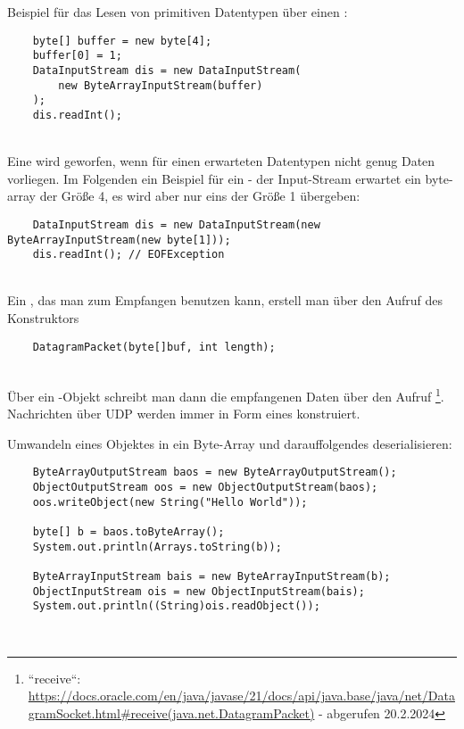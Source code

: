 \noindent
Beispiel für das Lesen von primitiven Datentypen über einen :

\begin{verbatim}
    byte[] buffer = new byte[4];
    buffer[0] = 1;
    DataInputStream dis = new DataInputStream(
        new ByteArrayInputStream(buffer)
    );
    dis.readInt();
\end{verbatim}\\

Eine  wird geworfen, wenn für einen erwarteten Datentypen nicht genug Daten vorliegen.
Im Folgenden ein Beispiel für ein  - der Input-Stream erwartet ein byte-array der Größe 4, es wird aber nur eins
der Größe 1 übergeben:

\begin{verbatim}
    DataInputStream dis = new DataInputStream(new ByteArrayInputStream(new byte[1]));
    dis.readInt(); // EOFException
\end{verbatim}\\

\noindent
Ein , das man zum Empfangen benutzen kann, erstell man über den Aufruf des Konstruktors

\begin{verbatim}
    DatagramPacket(byte[]buf, int length);
\end{verbatim}\\

Über ein -Objekt schreibt man dann die empfangenen Daten über den Aufruf \footnote{
``receive``: \url{https://docs.oracle.com/en/java/javase/21/docs/api/java.base/java/net/DatagramSocket.html#receive(java.net.DatagramPacket)} - abgerufen 20.2.2024
}.\\

Nachrichten über UDP werden immer in Form eines  konstruiert.

\noindent
Umwandeln eines Objektes in ein Byte-Array und darauffolgendes deserialisieren:

\begin{verbatim}
    ByteArrayOutputStream baos = new ByteArrayOutputStream();
    ObjectOutputStream oos = new ObjectOutputStream(baos);
    oos.writeObject(new String("Hello World"));

    byte[] b = baos.toByteArray();
    System.out.println(Arrays.toString(b));

    ByteArrayInputStream bais = new ByteArrayInputStream(b);
    ObjectInputStream ois = new ObjectInputStream(bais);
    System.out.println((String)ois.readObject());
\end{verbatim}\\

